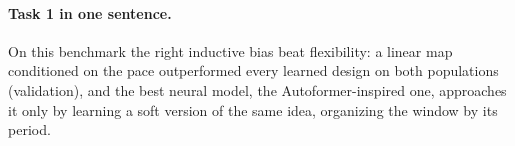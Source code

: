 \paragraph{Task 1 in one sentence.} On this benchmark the right inductive bias beat flexibility: a linear map conditioned on the pace outperformed every learned design on both populations (validation), and the best neural model, the Autoformer-inspired one, approaches it only by learning a soft version of the same idea, organizing the window by its period.

